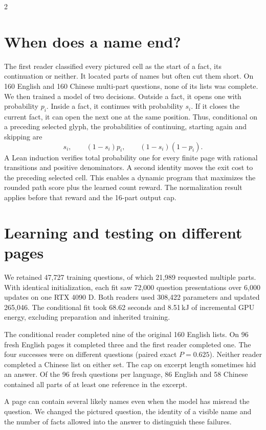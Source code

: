 \documentclass[10pt,a4paper]{article}
\newcommand{\spread}[1]{\noindent{\sffamily\bfseries\fontsize{19}{22}\selectfont #1\par}\vspace{4pt}}
\begin{document}
\begin{multicols}{2}
\section*{When does a name end?}
The first reader classified every pictured cell as the start of a fact, its continuation or neither. It located parts of names but often cut them short. On 160 English and 160 Chinese multi-part questions, none of its lists was complete. We then trained a model of two decisions. Outside a fact, it opens one with probability $p_i$. Inside a fact, it continues with probability $s_i$. If it closes the current fact, it can open the next one at the same position. Thus, conditional on a preceding selected glyph, the probabilities of continuing, starting again and skipping are
\[
s_i,\qquad (1-s_i)p_i,\qquad (1-s_i)(1-p_i).
\]
A Lean induction verifies total probability one for every finite page with rational transitions and positive denominators. A second identity moves the exit cost to the preceding selected cell. This enables a dynamic program that maximizes the rounded path score plus the learned count reward. The normalization result applies before that reward and the 16-part output cap.
\section*{Learning and testing on different pages}
We retained 47,727 training questions, of which 21,989 requested multiple parts. With identical initialization, each fit saw 72,000 question presentations over 6,000 updates on one RTX 4090 D. Both readers used 308,422 parameters and updated 265,046. The conditional fit took 68.62 seconds and 8.51\,kJ of incremental GPU energy, excluding preparation and inherited training.
\par The conditional reader completed nine of the original 160 English lists. On 96 fresh English pages it completed three and the first reader completed one. The four successes were on different questions (paired exact $P=0.625$). Neither reader completed a Chinese list on either set. The cap on excerpt length sometimes hid an answer. Of the 96 fresh questions per language, 86 English and 58 Chinese contained all parts of at least one reference in the excerpt.
\end{multicols}
\newpage
\spread{Counting, finding and stating the facts}
\noindent A page can contain several likely names even when the model has misread the question. We changed the pictured question, the identity of a visible name and the number of facts allowed into the answer to distinguish these failures.
\end{document}
